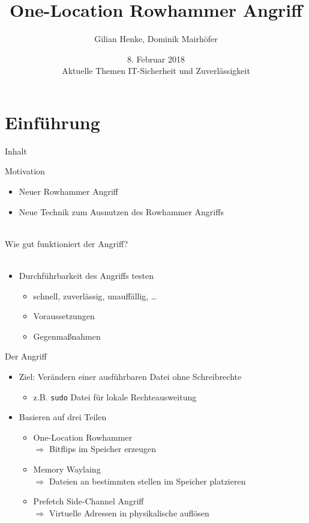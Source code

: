 \documentclass[german,10pt,xcolor=colortbl,compress
]{beamer}
\title{One-Location Rowhammer Angriff}
\date[]{8. Februar 2018\\[1ex] Aktuelle Themen IT-Sicherheit und Zuverlässigkeit}
\author[]{Gilian Henke, Dominik Mairhöfer}
\begin{document}
\section{Einführung}
\maketitle


\begin{frame}{Inhalt}
	\tableofcontents
\end{frame}

\begin{frame}{Motivation}

\begin{itemize}
	\item Neuer Rowhammer Angriff
	\item Neue Technik zum Ausnutzen des Rowhammer Angriffs
\end{itemize}
\pause
~\\
Wie gut funktioniert der Angriff?
~\\~\\
\begin{itemize}
	\item Durchführbarkeit des Angriffs testen
	\begin{itemize}
		\item schnell, zuverlässig, unauffällig, \dots
		\item Voraussetzungen
		\item Gegenmaßnahmen
	\end{itemize}
\end{itemize}

\end{frame}

\begin{frame}{Der Angriff}

\begin{itemize}
	\item Ziel: Verändern einer ausführbaren Datei ohne Schreibrechte
	\begin{itemize}
		\item z.B. \texttt{sudo} Datei für lokale Rechteausweitung
	\end{itemize}
	\item Basieren auf drei Teilen
	\begin{itemize}
		\item One-Location Rowhammer\\
		$ \Rightarrow $ Bitflips im Speicher erzeugen
		
		\item Memory Waylaing\\
		$ \Rightarrow $ Dateien an bestimmten stellen im Speicher platzieren
		
		\item Prefetch Side-Channel Angriff\\
		$ \Rightarrow $ Virtuelle Adressen in physikalische auflösen
	\end{itemize}
\end{itemize}

\end{frame}
\end{document}
